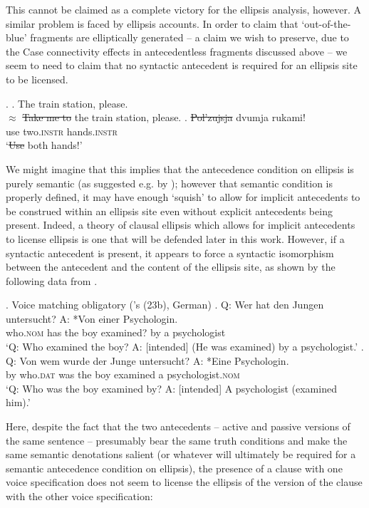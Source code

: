\documentclass[doublespace]{umthesis}
\begin{document}
This cannot be claimed as a complete victory for the ellipsis analysis, however. A similar problem is faced by ellipsis accounts. In order to claim that `out-of-the-blue' fragments are elliptically generated -- a claim we wish to preserve, due to the Case connectivity effects in antecedentless fragments discussed above -- we seem to need to claim that no syntactic antecedent is required for an ellipsis site to be licensed.

\ex. 	\a. The train station, please.\\
		$\approx$ \sout{Take me to} the train station, please.
	\bg. \sout{Pol'zujsja} dvumja rukami!\\
			use two.\textsc{instr} hands.\textsc{instr}\\
			`\sout{Use} both hands!'

We might imagine that this implies that the antecedence condition on ellipsis is purely semantic (as suggested e.g. by \cite{Me01}); however that semantic condition is properly defined, it may have enough `squish' to allow for implicit antecedents to be construed within an ellipsis site even without explicit antecedents being present. Indeed, a theory of clausal ellipsis which allows for implicit antecedents to license ellipsis is one that will be defended later in this work. However, if a syntactic antecedent is present, it appears to force a syntactic isomorphism between the antecedent and the content of the ellipsis site, as shown by the following data from \cite{Me10}.

\ex. 	Voice matching obligatory (\cite{Me10}'s (23b), German)
	\ag. Q: Wer hat den Jungen untersucht? A: *Von einer Psychologin.\\
	{} who.\textsc{nom} has the boy examined? {} by a psychologist\\
	`Q: Who examined the boy? A: [intended] (He was examined) by a psychologist.'
	\bg. Q: Von wem wurde der Junge untersucht? A: *Eine Psychologin.\\
	{} by who.\textsc{dat} was the boy examined {} a psychologist.\textsc{nom}\\
	`Q: Who was the boy examined by? A: [intended] A psychologist (examined him).'

Here, despite the fact that the two antecedents -- active and passive versions of the same sentence -- presumably bear the same truth conditions and make the same semantic denotations salient (or whatever will ultimately be required for a semantic antecedence condition on ellipsis), the presence of a clause with one voice specification does not seem to license the ellipsis of the version of the clause with the other voice specification: 
\end{document}
